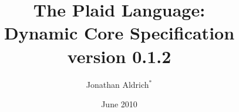 \documentclass[12pt]{article}
\title{The Plaid Language:\\
Dynamic Core Specification\\ %
\vspace{2ex}
version 0.1.2\\
\vspace{2ex}
}
\author{Jonathan Aldrich$^{\ast}$
}
\date{June 2010}
\begin{document}
\renewcommand*{\thepage}{title-\arabic{page}} 
\maketitle
\renewcommand*{\thepage}{\arabic{page}} 







\end{document}
